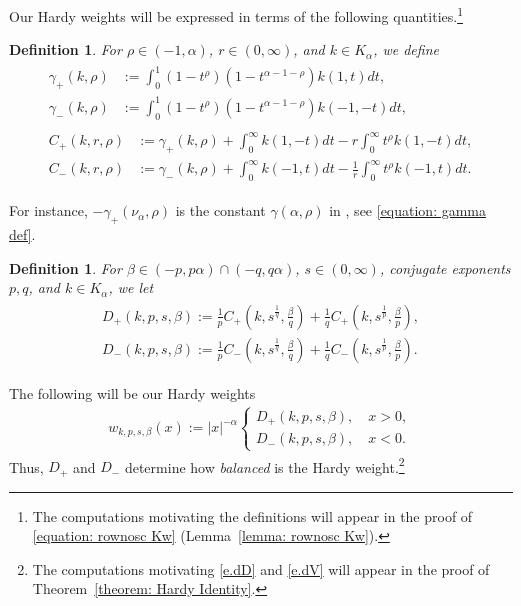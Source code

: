\documentclass[12pt, a4paper]{amsart}
\newtheorem{definition}[theorem]{Definition}
\begin{document}
Our Hardy weights will be expressed in terms of the following quantities.\footnote{The computations motivating the definitions will appear in the proof of \eqref{equation: rownosc Kw} (Lemma~\ref{lemma: rownosc Kw}).} 
\begin{definition}
\label{definition: gamma C}
For $\rho\in (-1, \alpha)$, $r \in (0, \infty)$, and $k \in K_\alpha$, we define
\begin{align}
\begin{split}\label{e.gamma}
\gamma_{+}(k, \rho) &:= \int_{0}^{1}(1 - t^\rho)(1 - t^{\alpha - 1- \rho})k(1, t)dt,
\\
    \gamma_{-}(k, \rho) &:= \int_{0}^{1}(1 - t^\rho)(1 - t^{\alpha - 1- \rho})k(-1, -t)dt,
\end{split}
\\
\begin{split}
\label{equation: stałe rownosc hardyego}
    C_{+}(k, r, \rho) &:= \gamma_{+}(k, \rho) + \int_{0}^{\infty}k(1, -t)dt - r\int_{0}^{\infty}t^\rho k(1, -t)dt, 
    \\
    C_{-}(k, r, \rho) &:= \gamma_{-}(k, \rho) + \int_{0}^{\infty}k(-1, t)dt - \frac{1}{r}\int_{0}^{\infty}t^\rho k(-1, t)dt.
\end{split}
\end{align}
\end{definition}
For instance, $-\gamma_+(\nu_\alpha,\rho)$ is the constant $\gamma(\alpha,\rho)$ in \cite[(5.2)]{MR2006232}, see  \eqref{equation: gamma def}. 
\begin{definition}
\label{definition: D}
For $\beta \in (-p, p\alpha) \cap \left(-q, q\alpha \right)$, $s \in (0, \infty)$, conjugate exponents $p, q$, and $k \in K_\alpha$, we let
\begin{align}
\begin{split}\label{e.dD}
    D_+(k, p, s, \beta) := \frac{1}{p}C_{+}\left(k, s^{\frac{1}{q}}, \frac{\beta}{q}\right) + \frac{1}{q}C_{+}\left(k, s^{\frac{1}{p}}, \frac{\beta}{p}\right),
    \\
    D_-(k, p, s, \beta) := \frac{1}{p}C_{-}\left(k, s^{\frac{1}{q}}, \frac{\beta}{q}\right) + \frac{1}{q}C_{-}\left(k, s^{\frac{1}{p}}, \frac{\beta}{p}\right).
\end{split}
\end{align}
\end{definition}


The following will be our Hardy weights
\begin{align}\label{e.dV}
    w_{k, p, s, \beta}(x) := |x|^{-\alpha} \begin{cases}
    D_+(k, p, s, \beta), \quad x > 0,
    \\
    D_-(k, p, s, \beta), \quad x < 0.
    \end{cases}
\end{align}
Thus, $D_+$ and $D_-$ determine how \textit{balanced} is the Hardy weight.\footnote{The computations motivating  \eqref{e.dD} and \eqref{e.dV} will appear in the proof of Theorem~\cref{theorem: Hardy Identity}.}
\end{document}
